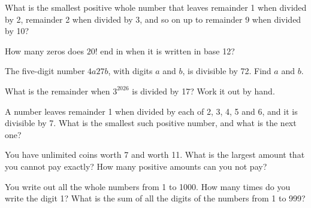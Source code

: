 \begin{question}\label{iq:iv1:number-riddles:6}
What is the smallest positive whole number that leaves remainder 1 when divided by 2, remainder 2 when divided by 3, and so on up to remainder 9 when divided by 10?
\end{question}

\begin{question}\label{iq:iv1:number-riddles:7}
How many zeros does $20!$ end in when it is written in base 12?
\end{question}

\begin{question}\label{iq:iv1:number-riddles:8}
The five-digit number $4a27b$, with digits $a$ and $b$, is divisible by 72. Find $a$ and $b$.
\end{question}

\begin{question}\label{iq:iv1:number-riddles:9}
What is the remainder when $3^{2026}$ is divided by 17? Work it out by hand.
\end{question}

\begin{question}\label{iq:iv1:number-riddles:10}
A number leaves remainder 1 when divided by each of 2, 3, 4, 5 and 6, and it is divisible by 7. What is the smallest such positive number, and what is the next one?
\end{question}

\begin{question}\label{iq:iv1:number-riddles:11}
You have unlimited coins worth 7 and worth 11. What is the largest amount that you cannot pay exactly? How many positive amounts can you not pay?
\end{question}

\begin{question}\label{iq:iv1:number-riddles:12}
You write out all the whole numbers from 1 to 1000. How many times do you write the digit 1? What is the sum of all the digits of the numbers from 1 to 999?
\end{question}

